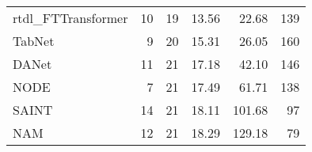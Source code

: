 \begin{tabular}{lrrrrr}
rtdl_FTTransformer &                            10 &  19 &  13.56 &                    22.68 &   139 \\
TabNet             &                             9 &  20 &  15.31 &                    26.05 &   160 \\
DANet              &                            11 &  21 &  17.18 &                    42.10 &   146 \\
NODE               &                             7 &  21 &  17.49 &                    61.71 &   138 \\
SAINT              &                            14 &  21 &  18.11 &                   101.68 &    97 \\
NAM                &                            12 &  21 &  18.29 &                   129.18 &    79 \\
\bottomrule
\end{tabular}
